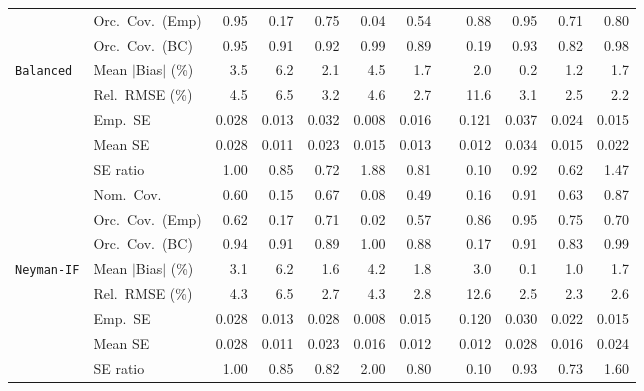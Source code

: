 \begin{landscape}
\begin{longtable}{llrrrrrrrrrr}
 & Orc.\ Cov.\ (Emp) & \cellcolor{rankone}0.95 & 0.17 & 0.75 & 0.04 & 0.54 &  & \cellcolor{ranktwo}0.88 & \cellcolor{rankone}0.95 & 0.71 & \cellcolor{rankthree}0.80 \\
 & Orc.\ Cov.\ (BC) & \cellcolor{rankone}0.95 & 0.91 & \cellcolor{rankthree}0.92 & 0.99 & 0.89 &  & 0.19 & \cellcolor{ranktwo}0.93 & 0.82 & \cellcolor{rankthree}0.98 \\
\addlinespace[2pt]
\quad \texttt{Balanced} & Mean $|$Bias$|$ (\%) & 3.5 & 6.2 & 2.1 & 4.5 & \cellcolor{rankthree}1.7 &  & 2.0 & \cellcolor{rankone}0.2 & \cellcolor{ranktwo}1.2 & \cellcolor{rankthree}1.7 \\
 & Rel.\ RMSE (\%) & 4.5 & 6.5 & 3.2 & 4.6 & \cellcolor{rankthree}2.7 &  & 11.6 & 3.1 & \cellcolor{ranktwo}2.5 & \cellcolor{rankone}2.2 \\
 & Emp.\ SE & 0.028 & 0.013 & 0.032 & 0.008 & 0.016 &  & 0.121 & 0.037 & 0.024 & 0.015 \\
 & Mean SE & 0.028 & 0.011 & 0.023 & 0.015 & 0.013 &  & 0.012 & 0.034 & 0.015 & 0.022 \\
 & SE ratio & \cellcolor{rankone}1.00 & \cellcolor{rankthree}0.85 & 0.72 & 1.88 & 0.81 &  & 0.10 & \cellcolor{ranktwo}0.92 & 0.62 & 1.47 \\
 & Nom.\ Cov. & 0.60 & 0.15 & \cellcolor{rankthree}0.67 & 0.08 & 0.49 &  & 0.16 & \cellcolor{rankone}0.91 & 0.63 & \cellcolor{ranktwo}0.87 \\
 & Orc.\ Cov.\ (Emp) & 0.62 & 0.17 & 0.71 & 0.02 & 0.57 &  & \cellcolor{ranktwo}0.86 & \cellcolor{rankone}0.95 & \cellcolor{rankthree}0.75 & 0.70 \\
 & Orc.\ Cov.\ (BC) & \cellcolor{rankone}0.94 & \cellcolor{ranktwo}0.91 & 0.89 & \cellcolor{rankthree}1.00 & 0.88 &  & 0.17 & \cellcolor{ranktwo}0.91 & 0.83 & \cellcolor{ranktwo}0.99 \\
\addlinespace[2pt]
\quad \texttt{Neyman-IF} & Mean $|$Bias$|$ (\%) & 3.1 & 6.2 & \cellcolor{rankthree}1.6 & 4.2 & 1.8 &  & 3.0 & \cellcolor{rankone}0.1 & \cellcolor{ranktwo}1.0 & 1.7 \\
 & Rel.\ RMSE (\%) & 4.3 & 6.5 & 2.7 & 4.3 & 2.8 &  & 12.6 & \cellcolor{ranktwo}2.5 & \cellcolor{rankone}2.3 & \cellcolor{rankthree}2.6 \\
 & Emp.\ SE & 0.028 & 0.013 & 0.028 & 0.008 & 0.015 &  & 0.120 & 0.030 & 0.022 & 0.015 \\
 & Mean SE & 0.028 & 0.011 & 0.023 & 0.016 & 0.012 &  & 0.012 & 0.028 & 0.016 & 0.024 \\
 & SE ratio & \cellcolor{rankone}1.00 & \cellcolor{rankthree}0.85 & 0.82 & 2.00 & 0.80 &  & 0.10 & \cellcolor{ranktwo}0.93 & 0.73 & 1.60 \\

\end{longtable}
\end{landscape}
